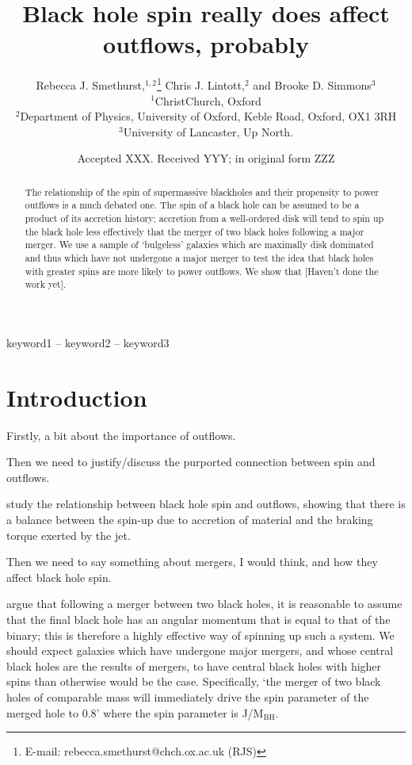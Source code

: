 \documentclass[a4paper,fleqn,usenatbib]{mnras}
\title[Bulgeless galaxies, black hole spin and outflows]{Black hole spin really does affect outflows, probably}
\author[Smethurst, Lintott and Simmons]{
Rebecca J. Smethurst,$^{1,2}$\thanks{E-mail: rebecca.smethurst@chch.ox.ac.uk (RJS)}
Chris J. Lintott,$^{2}$
and Brooke D. Simmons$^{3}$
\\
$^{1}$ChristChurch, Oxford\\
$^{2}$Department of Physics, University of Oxford, Keble Road, Oxford, OX1 3RH\\
$^{3}$University of Lancaster, Up North.}
\date{Accepted XXX. Received YYY; in original form ZZZ}
\begin{document}
\label{firstpage}
\pagerange{\pageref{firstpage}--\pageref{lastpage}}
\maketitle

\begin{abstract}
The relationship of the spin of supermassive blackholes and their propensity to power outflows is a much debated one. The spin of a black hole can be assumed to be a product of its accretion history; accretion from a well-ordered disk will tend to spin up the black hole less effectively that the merger of two black holes following a major merger. We use a sample of `bulgeless' galaxies which are maximally disk dominated and thus which have not undergone a major merger to test the idea that black holes with greater spins are more likely to power outflows. We show that [Haven't done the work yet]. 
\end{abstract}

\begin{keywords}
keyword1 -- keyword2 -- keyword3
\end{keywords}



\section{Introduction}

Firstly, a bit about the importance of outflows.

Then we need to justify/discuss the purported connection between spin and outflows.

\citet{BensonBabul} study the relationship between black hole spin and outflows, showing that there is a balance between the spin-up due to accretion of material and the braking torque exerted by the jet. 


Then we need to say something about mergers, I would think, and how they affect black hole spin.

\cite{Gammie04} argue that following a merger between two black holes, it is reasonable to assume that the final black hole has an angular momentum that is equal to that of the binary; this is therefore a highly effective way of spinning up such a system. We should expect galaxies which have undergone major mergers, and whose central black holes are the results of mergers, to have central black holes with higher spins than otherwise would be the case. Specifically, `the merger of two black holes of comparable mass will immediately drive the spin parameter of the merged hole to 0.8' where the spin parameter is J/$\mathrm{M_{BH}}$.
\end{document}
